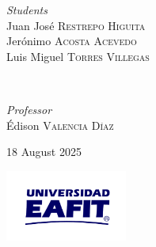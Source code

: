 \begin{titlepage}
	\begin{minipage}{0.4\textwidth}
		\begin{flushleft}
			\large
			\textit{Students}\\
			Juan José \textsc{Restrepo Higuita}\\
			Jerónimo \textsc{Acosta Acevedo}\\
			Luis Miguel \textsc{Torres Villegas}\\
		\end{flushleft}
	\end{minipage}
	~
	\begin{minipage}{0.4\textwidth}
		\begin{flushright}
			\large
			\textit{Professor}\\
			Édison \textsc{Valencia Díaz}
		\end{flushright}
	\end{minipage}



	\vfill\vfill\vfill %

	{\large 18 August 2025} %


	\vfill\vfill
	\includegraphics[width=0.3\textwidth]{images/logo-eafit-latex.pdf}\\[1cm] %


	\vfill %

\end{titlepage}
